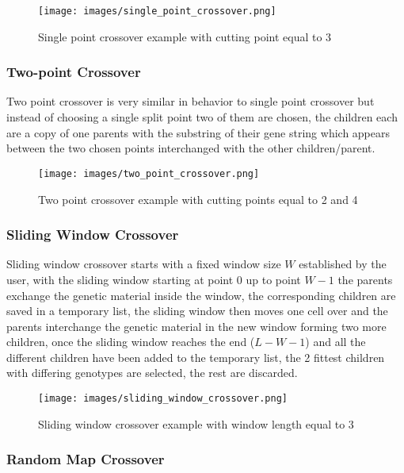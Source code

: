 	\begin{figure}[!htb]
	\centering
	\texttt{[image: images/single\_point\_crossover.png]}
	\caption{Single point crossover example with cutting point equal to 3}
	\label{fig:Single point crossover}
	\end{figure}

	\subsubsection{Two-point Crossover}

	Two point crossover is very similar in behavior to single point crossover but instead of choosing a single split point two of them are chosen, the children each are a copy of one parents with the substring of their gene string which appears between the two chosen points interchanged with the other children/parent.

	\begin{figure}[!htb]
	\centering
	\texttt{[image: images/two\_point\_crossover.png]}
	\caption{Two point crossover example with cutting points equal to 2 and 4}
	\label{fig:Two point crossover}
	\end{figure}

	\subsubsection{Sliding Window Crossover}

	Sliding window crossover starts with a fixed window size $W$ established by the user, with the sliding window starting at point 0 up to point $W-1$ the parents exchange the genetic material inside the window, the corresponding children are saved in a temporary list, the sliding window then moves one cell over and the parents interchange the genetic material in the new window forming two more children, once the sliding window reaches the end ($L-W-1$) and all the different children have been added to the temporary list, the 2 fittest children with differing genotypes are selected, the rest are discarded. 	

	\begin{figure}[!htb]
	\centering
	\texttt{[image: images/sliding\_window\_crossover.png]}
	\caption{Sliding window crossover example with window length equal to 3}
	\label{fig:Sliding window crossover}
	\end{figure}

	\subsubsection{Random Map Crossover}

